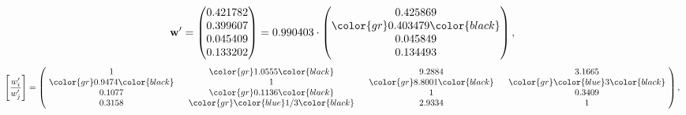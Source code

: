 \begin{example}
\begin{equation*}
\mathbf{w}^{\prime} =
\begin{pmatrix}
0.421782\\
0.399607\\
0.045409\\
0.133202
\end{pmatrix} =
0.990403\cdot
\begin{pmatrix}
0.425869\\
\color{gr} 0.403479\color{black} \\
0.045849\\
0.134493
\end{pmatrix},
\end{equation*}
\begin{equation*}
\left[ \frac{{w}^{\prime}_i}{{w}^{\prime}_j} \right] =
\begin{pmatrix}
$\,\,$ 1 $\,\,$ & $\,\,$\color{gr} 1.0555\color{black} $\,\,$ & $\,\,$9.2884$\,\,$ & $\,\,$3.1665$\,\,$ \\
$\,\,$\color{gr} 0.9474\color{black} $\,\,$ & $\,\,$ 1 $\,\,$ & $\,\,$\color{gr} 8.8001\color{black} $\,\,$ & $\,\,$\color{gr} \color{blue} 3\color{black}   $\,\,$ \\
$\,\,$0.1077$\,\,$ & $\,\,$\color{gr} 0.1136\color{black} $\,\,$ & $\,\,$ 1 $\,\,$ & $\,\,$0.3409 $\,\,$ \\
$\,\,$0.3158$\,\,$ & $\,\,$\color{gr} \color{blue}  1/3\color{black} $\,\,$ & $\,\,$2.9334$\,\,$ & $\,\,$ 1  $\,\,$ \\
\end{pmatrix},
\end{equation*}
\end{example}
\newpage
